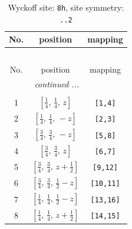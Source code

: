 \documentclass[fleqn,8pt]{jsarticle}
\begin{document}
\begin{longtable}{ccc}
\caption{Wyckoff site: {\tt 8h}, site symmetry: {\tt ..2}}
 \\
 \hline \hline
No. & position & mapping \\ \hline \endfirsthead

\multicolumn{2}{l}{\tablename\ \thetable{}} \\
 \hline \hline
No. & position & mapping \\ \hline \endhead

 \hline \hline
\multicolumn{2}{r}{\footnotesize\it continued ...} \\ \endfoot

 \hline \hline
\multicolumn{2}{r}{} \\ \endlastfoot

1 & $\left[ \frac{1}{4},\, \frac{1}{4},\, z \right]$ & {\tt [1,4]} \\ \hline
2 & $\left[ \frac{1}{4},\, \frac{1}{4},\, - z \right]$ & {\tt [2,3]} \\ \hline
3 & $\left[ \frac{3}{4},\, \frac{3}{4},\, - z \right]$ & {\tt [5,8]} \\ \hline
4 & $\left[ \frac{3}{4},\, \frac{3}{4},\, z \right]$ & {\tt [6,7]} \\ \hline
5 & $\left[ \frac{3}{4},\, \frac{3}{4},\, z + \frac{1}{2} \right]$ & {\tt [9,12]} \\ \hline
6 & $\left[ \frac{3}{4},\, \frac{3}{4},\, \frac{1}{2} - z \right]$ & {\tt [10,11]} \\ \hline
7 & $\left[ \frac{1}{4},\, \frac{1}{4},\, \frac{1}{2} - z \right]$ & {\tt [13,16]} \\ \hline
8 & $\left[ \frac{1}{4},\, \frac{1}{4},\, z + \frac{1}{2} \right]$ & {\tt [14,15]} \\
\end{longtable}
\renewcommand{\arraystretch}{1.2}
\end{document}
